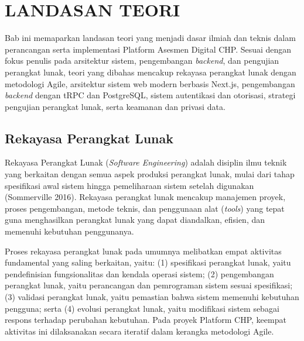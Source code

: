 \chapter{LANDASAN TEORI}
\label{chap:landasan-teori}

Bab ini memaparkan landasan teori yang menjadi dasar ilmiah dan teknis dalam perancangan serta implementasi Platform Asesmen Digital CHP. Sesuai dengan fokus penulis pada arsitektur sistem, pengembangan \textit{backend}, dan pengujian perangkat lunak, teori yang dibahas mencakup rekayasa perangkat lunak dengan metodologi Agile, arsitektur sistem web modern berbasis Next.js, pengembangan \textit{backend} dengan tRPC dan PostgreSQL, sistem autentikasi dan otorisasi, strategi pengujian perangkat lunak, serta keamanan dan privasi data.

\section{Rekayasa Perangkat Lunak}
\label{sec:rekayasa-pl}

Rekayasa Perangkat Lunak (\textit{Software Engineering}) adalah disiplin ilmu teknik yang berkaitan dengan semua aspek produksi perangkat lunak, mulai dari tahap spesifikasi awal sistem hingga pemeliharaan sistem setelah digunakan (Sommerville 2016). Rekayasa perangkat lunak mencakup manajemen proyek, proses pengembangan, metode teknis, dan penggunaan alat (\textit{tools}) yang tepat guna menghasilkan perangkat lunak yang dapat diandalkan, efisien, dan memenuhi kebutuhan penggunanya.

Proses rekayasa perangkat lunak pada umumnya melibatkan empat aktivitas fundamental yang saling berkaitan, yaitu: (1) spesifikasi perangkat lunak, yaitu pendefinisian fungsionalitas dan kendala operasi sistem; (2) pengembangan perangkat lunak, yaitu perancangan dan pemrograman sistem sesuai spesifikasi; (3) validasi perangkat lunak, yaitu pemastian bahwa sistem memenuhi kebutuhan pengguna; serta (4) evolusi perangkat lunak, yaitu modifikasi sistem sebagai respons terhadap perubahan kebutuhan. Pada proyek Platform CHP, keempat aktivitas ini dilaksanakan secara iteratif dalam kerangka metodologi Agile.


